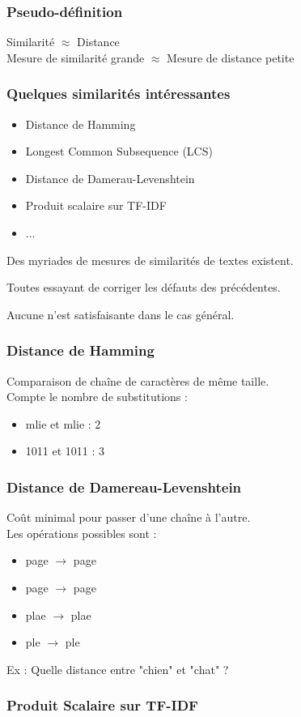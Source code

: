 \begin{frame}
  \frametitle{Pseudo-définition}
  \begin{center}
  Similarité $\approx$ Distance\\
  $\;$\\
  Mesure de similarité grande $\approx$ Mesure de distance petite
  \end{center}
\end{frame}

\begin{frame}
  \frametitle{Quelques similarités intéressantes}
  \begin{itemize}
  \item Distance de Hamming
  \item Longest Common Subsequence (LCS)
  \item Distance de Damerau-Levenshtein
  \item Produit scalaire sur TF-IDF
  \item ...
  \end{itemize}
  Des myriades de mesures de similarités de textes existent.

  Toutes essayant de corriger les défauts des précédentes.

  Aucune n'est satisfaisante dans le cas général. 
\end{frame}

\begin{frame}
  \frametitle{Distance de Hamming}
  Comparaison de chaîne de caractères de même taille. \\
  Compte le nombre de substitutions :
  \begin{itemize}
  \item {}mlie et mlie : 2
  \item 1011 et 1011 : 3
  \end{itemize}
\end{frame}

\begin{frame}
  \frametitle{Distance de Damereau-Levenshtein}
  Coût minimal pour passer d'une chaîne à l'autre. \\
  Les opérations possibles sont : 
  \begin{itemize}
  \item {} page $\rightarrow$ page 
  \item {} page $\rightarrow$ page
  \item {} plae $\rightarrow$ plae
  \item {} ple $\rightarrow$ 
  ple
  \end{itemize}
  Ex : Quelle distance entre "chien" et "chat" ? 
\end{frame}

\begin{frame}
  \frametitle{Produit Scalaire sur TF-IDF}
\end{frame}
